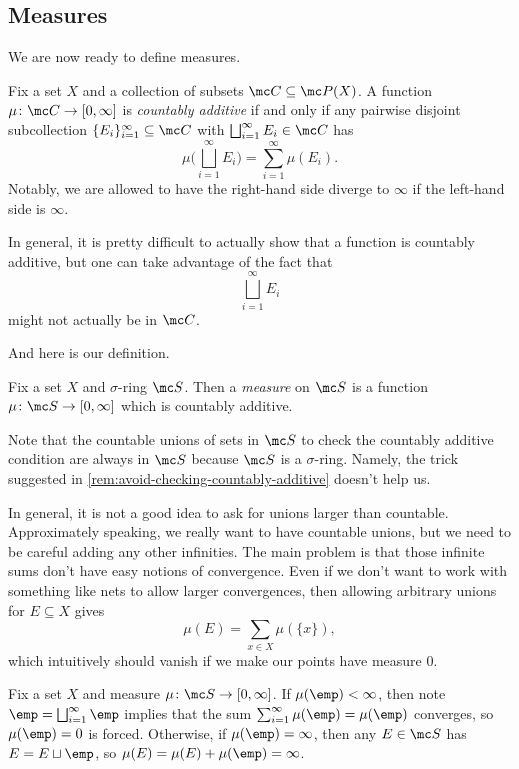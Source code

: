 \documentclass[../notes.tex]{subfiles}
\begin{document}
\subsection{Measures}
We are now ready to define measures.
\begin{definition}
	Fix a set $X$ and a collection of subsets $\mc C\subseteq\mc P(X)$. A function $\mu\colon\mc C\to[0,\infty]$ is \textit{countably additive} if and only if any pairwise disjoint subcollection $\{E_i\}_{i=1}^\infty\subseteq\mc C$ with $\bigsqcup_{i=1}^\infty E_i\in\mc C$ has
	\[\mu\Bigg(\bigsqcup_{i=1}^\infty E_i\Bigg)=\sum_{i=1}^\infty\mu(E_i).\]
	Notably, we are allowed to have the right-hand side diverge to $\infty$ if the left-hand side is $\infty$.
\end{definition}
\begin{remark} \label{rem:avoid-checking-countably-additive}
	In general, it is pretty difficult to actually show that a function is countably additive, but one can take advantage of the fact that
	\[\bigsqcup_{i=1}^\infty E_i\]
	might not actually be in $\mc C$.
\end{remark}
And here is our definition.
\begin{definition}[Measure]
	Fix a set $X$ and $\sigma$-ring $\mc S$. Then a \textit{measure} on $\mc S$ is a function $\mu\colon\mc S\to[0,\infty]$ which is countably additive.
\end{definition}
\begin{remark}
	Note that the countable unions of sets in $\mc S$ to check the countably additive condition are always in $\mc S$ because $\mc S$ is a $\sigma$-ring. Namely, the trick suggested in \autoref{rem:avoid-checking-countably-additive} doesn't help us.
\end{remark}
\begin{remark}
	In general, it is not a good idea to ask for unions larger than countable. Approximately speaking, we really want to have countable unions, but we need to be careful adding any other infinities. The main problem is that those infinite sums don't have easy notions of convergence. Even if we don't want to work with something like nets to allow larger convergences, then allowing arbitrary unions for $E\subseteq X$ gives
	\[\mu(E)=\sum_{x\in X}\mu(\{x\}),\]
	which intuitively should vanish if we make our points have measure $0$.
\end{remark}
\begin{remark}
	Fix a set $X$ and measure $\mu\colon\mc S\to[0,\infty]$. If $\mu(\emp)<\infty$, then note $\emp=\bigsqcup_{i=1}^\infty\emp$ implies that the sum $\sum_{i=1}^\infty\mu(\emp)=\mu(\emp)$ converges, so $\mu(\emp)=0$ is forced. Otherwise, if $\mu(\emp)=\infty$, then any $E\in\mc S$ has $E=E\sqcup\emp$, so $\mu(E)=\mu(E)+\mu(\emp)=\infty$.
\end{remark}
\end{document}
